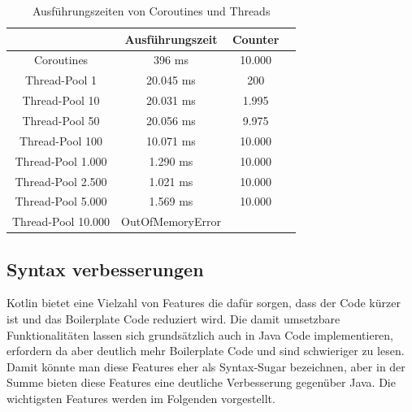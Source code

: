 \documentclass[11pt]{article}
\begin{document}
    \begin{table}[h!]
        \centering
        \begin{tabular}{|c|c|c|c|}
            \hline
             & \textbf{Ausführungszeit} & \textbf{Counter}\\
            \hline
            Coroutines & 396 ms & 10.000   \\
            \hline
            Thread-Pool 1 & 20.045 ms  & 200  \\
            \hline
            Thread-Pool 10 & 20.031 ms  & 1.995  \\
            \hline
            Thread-Pool 50 & 20.056 ms  & 9.975  \\
            \hline
            Thread-Pool 100 & 10.071 ms  & 10.000  \\
            \hline
            Thread-Pool 1.000 & 1.290 ms  & 10.000  \\
            \hline
            Thread-Pool 2.500 & 1.021 ms  & 10.000  \\
            \hline
            Thread-Pool 5.000 & 1.569 ms  & 10.000  \\
            \hline
            Thread-Pool 10.000 & OutOfMemoryError  &   \\
            \hline
        \end{tabular}
        \caption{Ausführungszeiten von Coroutines und Threads}
        \label{tab:coroutine-thread-pool}
    \end{table}

    \subsection{Syntax verbesserungen}
    Kotlin bietet eine Vielzahl von Features die dafür sorgen, dass der Code kürzer ist und das Boilerplate Code reduziert wird.
    Die damit umsetzbare Funktionalitäten lassen sich grundsätzlich auch in Java Code implementieren, erfordern da aber deutlich mehr Boilerplate Code und sind schwieriger zu lesen.
    Damit könnte man diese Features eher als Syntax-Sugar bezeichnen, aber in der Summe bieten diese Features eine deutliche Verbesserung gegenüber Java.
    Die wichtigsten Features werden im Folgenden vorgestellt.
\end{document}
